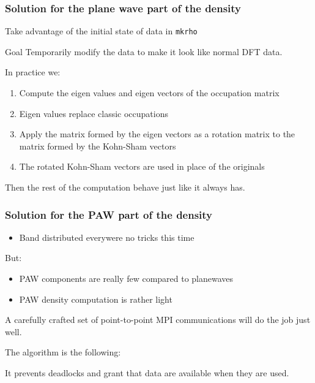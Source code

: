 \begin{frame}
  \frametitle{Solution for the plane wave part of the density}
  Take advantage of the initial state of data in \texttt{mkrho}
  
  \begin{block}{Goal}
    Temporarily modify the data to make it look like normal DFT data.
  \end{block}
\end{frame}

\begin{frame}
  In practice we:
  \begin{enumerate}
    \item Compute the eigen values and eigen vectors of the occupation matrix
    \item Eigen values replace classic occupations
    \item Apply the matrix formed by the eigen vectors as a rotation matrix to
      the matrix formed by the Kohn-Sham vectors
    \item The rotated Kohn-Sham vectors are used in place of the originals
  \end{enumerate}

  Then the rest of the computation behave just like it always has.
\end{frame}

\begin{frame}
  \frametitle{Solution for the PAW part of the density}
  \begin{itemize}
    \item Band distributed everywere \Rightarrow no tricks this time
  \end{itemize}
  But:
  \begin{itemize}
    \item PAW components are really few compared to planewaves
    \item PAW density computation is rather light
  \end{itemize}
  A carefully crafted set of point-to-point MPI communications will do the job
  just well.
\end{frame}


\begin{frame}[fragile]
  The algorithm is the following:
  \begin{algorithm}[H]
  \end{algorithm}
  It prevents deadlocks and grant that data are available when they are used.
\end{frame}

